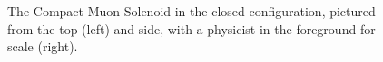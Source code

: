 \begin{figure}[htb]
    \centering
    \quad
    \caption{
        The Compact Muon Solenoid in the closed configuration, pictured from the top (left) and side, with a physicist in the foreground for scale (right).
    }
    \label{fig:cms_jguiang}
\end{figure}

